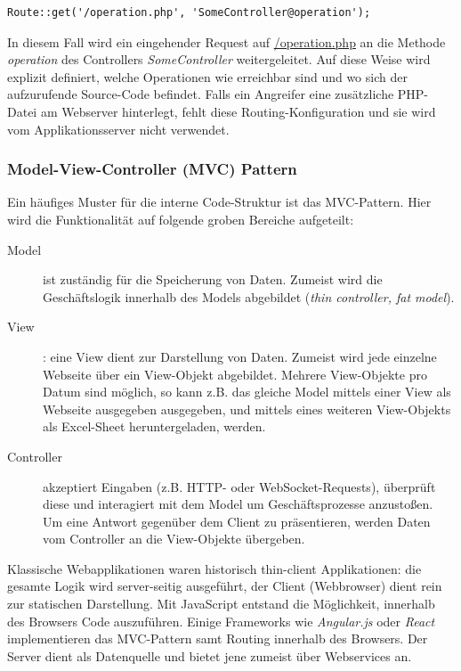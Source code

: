 \begin{verbatim}
Route::get('/operation.php', 'SomeController@operation');
\end{verbatim}

In diesem Fall wird ein eingehender Request auf \url{/operation.php} an die Methode \textit{operation} des Controllers \textit{SomeController} weitergeleitet. Auf diese Weise wird explizit definiert, welche Operationen wie erreichbar sind und wo sich der aufzurufende Source-Code befindet. Falls ein Angreifer eine zusätzliche PHP-Datei am Webserver hinterlegt, fehlt diese Routing-Konfiguration und sie wird vom Applikationsserver nicht verwendet.

\subsubsection{Model-View-Controller (MVC) Pattern}

Ein häufiges Muster für die interne Code-Struktur ist das MVC-Pattern. Hier wird die Funktionalität auf folgende groben Bereiche aufgeteilt:

\begin{description}
	\item[Model] ist zuständig für die Speicherung von Daten. Zumeist wird die Geschäftslogik innerhalb des Models abgebildet (\textit{thin controller, fat model}).
	\item[View]: eine View dient zur Darstellung von Daten. Zumeist wird jede einzelne Webseite über ein View-Objekt abgebildet. Mehrere View-Objekte pro Datum sind möglich, so kann z.B. das gleiche Model mittels einer View als Webseite ausgegeben ausgegeben, und mittels eines weiteren View-Objekts als Excel-Sheet heruntergeladen, werden.
	\item[Controller] akzeptiert Eingaben (z.B. HTTP- oder WebSocket-Requests), überprüft diese und interagiert mit dem Model um Geschäftsprozesse anzustoßen. Um eine Antwort gegenüber dem Client zu präsentieren, werden Daten vom Controller an die View-Objekte übergeben.
\end{description}

Klassische Webapplikationen waren historisch thin-client Applikationen: die gesamte Logik wird server-seitig ausgeführt, der Client (Webbrowser) dient rein zur statischen Darstellung. Mit JavaScript entstand die Möglichkeit, innerhalb des Browsers Code auszuführen. Einige Frameworks wie \textit{Angular.js} oder \textit{React} implementieren das MVC-Pattern samt Routing innerhalb des Browsers. Der Server dient als Datenquelle und bietet jene zumeist über Webservices an.

